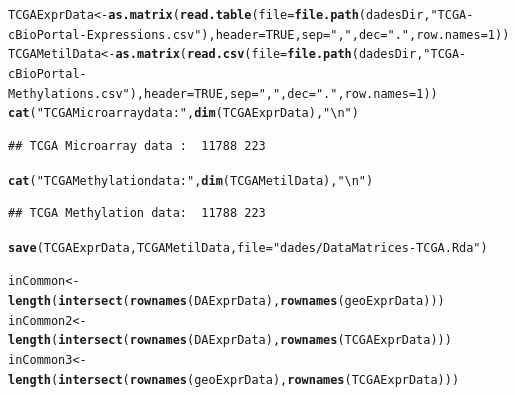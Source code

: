 \documentclass[a4paper,10pt]{article}\usepackage[]{graphicx}\usepackage[]{xcolor}
\makeatletter
\newcommand{\hlnum}[1]{\textcolor[rgb]{0.686,0.059,0.569}{#1}}%
\newcommand{\hlstr}[1]{\textcolor[rgb]{0.192,0.494,0.8}{#1}}%
\newcommand{\hlstd}[1]{\textcolor[rgb]{0.345,0.345,0.345}{#1}}%
\newcommand{\hlkwb}[1]{\textcolor[rgb]{0.69,0.353,0.396}{#1}}%
\newcommand{\hlkwc}[1]{\textcolor[rgb]{0.333,0.667,0.333}{#1}}%
\newcommand{\hlkwd}[1]{\textcolor[rgb]{0.737,0.353,0.396}{\textbf{#1}}}%
\newenvironment{kframe}{%
 \def\at@end@of@kframe{}%
 \ifinner\ifhmode%
  \def\at@end@of@kframe{\end{minipage}}%
  \begin{minipage}{\columnwidth}%
 \fi\fi%
 \def\FrameCommand##1{\hskip\@totalleftmargin \hskip-\fboxsep
 \colorbox{shadecolor}{##1}\hskip-\fboxsep
     \hskip-\linewidth \hskip-\@totalleftmargin \hskip\columnwidth}%
 \MakeFramed {\advance\hsize-\width
   \@totalleftmargin\z@ \linewidth\hsize
   \@setminipage}}%
 {\par\unskip\endMakeFramed%
 \at@end@of@kframe}
\newenvironment{knitrout}{}{} %
\makeatother
\begin{document}
\begin{knitrout}
\color{fgcolor}\begin{kframe}
\begin{alltt}
\hlstd{TCGAExprData} \hlkwb{<-}  \hlkwd{as.matrix}\hlstd{(}\hlkwd{read.table}\hlstd{(}\hlkwc{file}\hlstd{=}\hlkwd{file.path}\hlstd{(dadesDir,}\hlstr{"TCGA-cBioPortal-Expressions.csv"}\hlstd{),} \hlkwc{header}\hlstd{=}\hlnum{TRUE}\hlstd{,} \hlkwc{sep}\hlstd{=}\hlstr{","}\hlstd{,} \hlkwc{dec}\hlstd{=}\hlstr{"."}\hlstd{,} \hlkwc{row.names}\hlstd{=}\hlnum{1}\hlstd{))}
\hlstd{TCGAMetilData} \hlkwb{<-}  \hlkwd{as.matrix}\hlstd{(}\hlkwd{read.csv}\hlstd{(}\hlkwc{file}\hlstd{=}\hlkwd{file.path}\hlstd{(dadesDir,}\hlstr{"TCGA-cBioPortal-Methylations.csv"}\hlstd{),} \hlkwc{header}\hlstd{=}\hlnum{TRUE}\hlstd{,} \hlkwc{sep}\hlstd{=}\hlstr{","}\hlstd{,} \hlkwc{dec}\hlstd{=}\hlstr{"."}\hlstd{,} \hlkwc{row.names}\hlstd{=}\hlnum{1}\hlstd{))}
\hlkwd{cat}\hlstd{(}\hlstr{"TCGA Microarray data : "}\hlstd{,} \hlkwd{dim}\hlstd{(TCGAExprData),} \hlstr{"\textbackslash{}n"}\hlstd{)}
\end{alltt}
\begin{verbatim}
## TCGA Microarray data :  11788 223
\end{verbatim}
\begin{alltt}
\hlkwd{cat}\hlstd{(}\hlstr{"TCGA Methylation data: "}\hlstd{,} \hlkwd{dim}\hlstd{(TCGAMetilData),} \hlstr{"\textbackslash{}n"}\hlstd{)}
\end{alltt}
\begin{verbatim}
## TCGA Methylation data:  11788 223
\end{verbatim}
\begin{alltt}
\hlkwd{save}\hlstd{(TCGAExprData, TCGAMetilData,} \hlkwc{file}\hlstd{=}\hlstr{"dades/DataMatrices-TCGA.Rda"}\hlstd{)}
\end{alltt}
\end{kframe}
\end{knitrout}

\begin{knitrout}
\color{fgcolor}\begin{kframe}
\begin{alltt}
\hlstd{inCommon}\hlkwb{<-} \hlkwd{length}\hlstd{(}\hlkwd{intersect}\hlstd{(}\hlkwd{rownames}\hlstd{(DAExprData),} \hlkwd{rownames}\hlstd{(geoExprData)))}
\hlstd{inCommon2} \hlkwb{<-} \hlkwd{length}\hlstd{(}\hlkwd{intersect}\hlstd{(}\hlkwd{rownames}\hlstd{(DAExprData),} \hlkwd{rownames}\hlstd{(TCGAExprData)))}
\hlstd{inCommon3} \hlkwb{<-} \hlkwd{length}\hlstd{(}\hlkwd{intersect}\hlstd{(}\hlkwd{rownames}\hlstd{(geoExprData),} \hlkwd{rownames}\hlstd{(TCGAExprData)))}
\end{alltt}
\end{kframe}
\end{knitrout}
\end{document}

